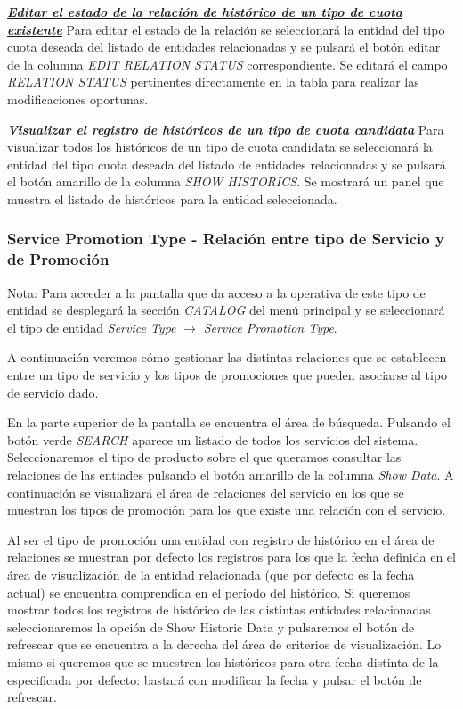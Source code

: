 \underline{\textsl{\textbf{Editar el estado de la relación de histórico de un tipo de cuota existente}}}
Para editar el estado de la relación se seleccionará la entidad del tipo cuota deseada del listado de entidades relacionadas y se pulsará el botón editar de la columna \textit{EDIT RELATION STATUS} correspondiente. Se editará el campo \emph{RELATION STATUS}  pertinentes directamente en la tabla para realizar las modificaciones oportunas.

\underline{\textsl{\textbf{Visualizar el registro de históricos de un tipo de cuota candidata}}}
Para visualizar todos los históricos de un tipo de cuota candidata se seleccionará la entidad del tipo cuota deseada del listado de entidades relacionadas y se pulsará el botón amarillo de la columna \textit{SHOW HISTORICS}. Se mostrará un panel que muestra el listado de históricos para la entidad seleccionada. 



\subsubsection{Service Promotion Type - Relación entre tipo de Servicio y de Promoción}
\label{sub:product-promotion-type-relation}

Nota: Para acceder a la pantalla que da acceso a la operativa de este tipo de entidad se desplegará la sección \emph{CATALOG} del menú principal y se seleccionará el tipo de entidad \emph{Service Type} $\rightarrow$  \emph{Service Promotion Type}.


A continuación veremos cómo gestionar las distintas relaciones que se establecen entre un tipo de servicio y los tipos de promociones que pueden asociarse al tipo de servicio dado.


En la parte superior de la pantalla se encuentra el área de búsqueda. Pulsando el botón verde \emph{SEARCH} aparece un listado de todos los servicios del sistema. Seleccionaremos el tipo de producto sobre el que queramos consultar las relaciones de las entiades pulsando el botón amarillo de la columna \emph{Show Data}. A continuación se visualizará el área de relaciones del servicio en los que se muestran los tipos de promoción para los que existe una relación con el servicio.

Al ser el tipo de promoción una entidad con registro de histórico en el área de relaciones se muestran por defecto los registros para los que la fecha definida en el área de visualización de la entidad relacionada (que por defecto es la fecha actual) se encuentra comprendida en el período del histórico. Si queremos mostrar todos los registros de histórico de las distintas entidades relacionadas seleccionaremos la opción de Show Historic Data y pulsaremos el botón de refrescar que se encuentra a la derecha del área de criterios de visualización. Lo mismo si queremos que se muestren los históricos para otra fecha distinta de la especificada por defecto: bastará con modificar la fecha y pulsar el botón de refrescar.

